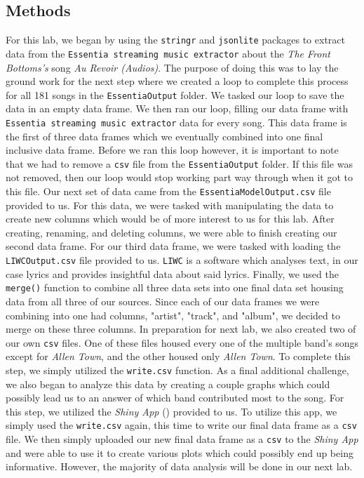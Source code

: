 \documentclass{article}\usepackage[]{graphicx}\usepackage[]{xcolor}
\begin{document}
\begin{multicols}{2}
\section{Methods}
For this lab, we began by using the \texttt{stringr} and \texttt{jsonlite} packages to extract data from the \texttt{Essentia streaming music extractor} about the \textit{The Front Bottoms's} song \textit{Au Revoir (Audios)}. The purpose of doing this was to lay the ground work for the next step where we created a loop to complete this process for all 181 songs in the \texttt{EssentiaOutput} folder. We tasked our loop to save the data in an empty data frame. We then ran our loop, filling our data frame with \texttt{Essentia streaming music extractor} data for every song. This data frame is the first of three data frames which we eventually combined into one final inclusive data frame. Before we ran this loop however, it is important to note that we had to remove a \texttt{csv} file from the \texttt{EssentiaOutput} folder. If this file was not removed, then our loop would stop working part way through when it got to this file. Our next set of data came from the \texttt{EssentiaModelOutput.csv} file provided to us. For this data, we were tasked with manipulating the data to create new columns which would be of more interest to us for this lab. After creating, renaming, and deleting columns, we were able to finish creating our second data frame. For our third data frame, we were tasked with loading the \texttt{LIWCOutput.csv} file provided to us. \texttt{LIWC} is a software which analyses text, in our case lyrics and provides insightful data about said lyrics. Finally, we used the \texttt{merge()} function to combine all three data sets into one final data set housing data from all three of our sources. Since each of our data frames we were combining into one had columns, "artist", "track", and "album", we decided to merge on these three columns. In preparation for next lab, we also created two of our own \texttt{csv} files. One of these files housed every one of the multiple band's songs except for \textit{Allen Town}, and the other housed only \textit{Allen Town}. To complete this step, we simply utilized the \texttt{write.csv} function. As a final additional challenge, we also began to analyze this data by creating a couple graphs which could possibly lead us to an answer of which band contributed most to the song. For this step, we utilized the \textit{Shiny App} (\cite{Shiny}) provided to us. To utilize this app, we simply used the \texttt{write.csv} again, this time to write our final data frame as a \texttt{csv} file. We then simply uploaded our new final data frame as a \texttt{csv} to the \textit{Shiny App} and were able to use it to create various plots which could possibly end up being informative. However, the majority of data analysis will be done in our next lab.


\end{multicols}
\end{document}
